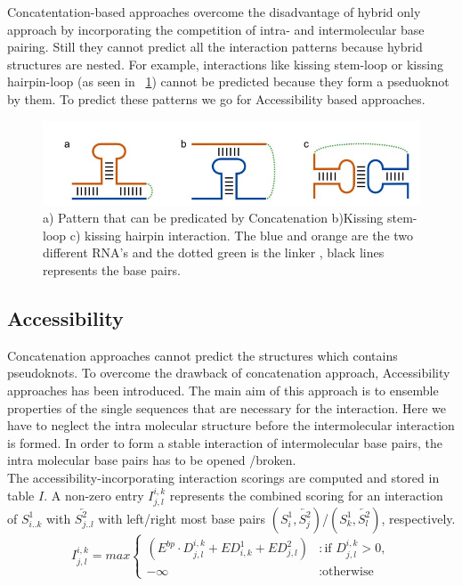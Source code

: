 \documentclass[twoside,a4paper]{report}
\begin{document}
	Concatentation-based approaches overcome the disadvantage of hybrid only approach by incorporating the competition of intra- and intermolecular base pairing. Still they cannot predict all the interaction patterns because  hybrid structures are nested. For example, interactions like kissing stem-loop or kissing hairpin-loop (as seen in ~\ref{fig:concat}) cannot be predicted because they form a pseduoknot by them. To predict these patterns we go for Accessibility based approaches.\\
	 \begin{figure}[H]
		\includegraphics[width=0.9\linewidth]{concat}
		\centering
		\caption{a) Pattern that can be predicated by Concatenation b)Kissing stem-loop c) kissing hairpin interaction. The blue and orange are the two different RNA's and the dotted green is the linker , black lines represents the base pairs. } 
		\label{fig:concat}
	\end{figure}
	
	
	\subsection{Accessibility}
	Concatenation approaches cannot predict the structures which contains pseudoknots. To overcome the drawback of concatenation approach, Accessibility approaches has been introduced. The main aim of this approach is to ensemble properties of the single sequences that are necessary for the interaction. Here we have to neglect the intra molecular structure before the intermolecular interaction is formed. In order to form a stable interaction of intermolecular base pairs, the intra molecular base pairs has to be opened /broken. \\
	
	The accessibility-incorporating interaction scorings
	are computed and stored in table $I$. A non-zero entry $I^{i,k}_{j,l}$
	represents the combined scoring for an interaction of
	$S^1_{i..k}$ with $\overleftarrow{S^2_{j..l}}$ with
	left/right most base pairs $(S^1_i,\overleftarrow{S^2_j})$/$(S^1_k,\overleftarrow{S^2_l})$, respectively.\\


	\begin{equation}
	\label{eq:4}
	I^{i, k}_{j, l} = max \begin{cases}
	(E^{bp} \cdot D^{i, k}_{j, l} +ED^{1}_{i,k} +ED^{2}_{j, l}) & : \text{if } D^{i, k}_{j, l} > 0  ,\\-\infty & :\text{otherwise}
	\end{cases}
	\end{equation}
	
\end{document}
